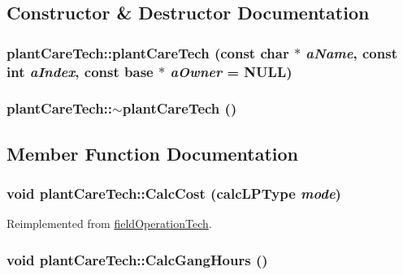 \subsection{Constructor \& Destructor Documentation}
\hypertarget{classplant_care_tech_a833337d3d8b192ab21e01e17e0907490}{
\subsubsection[{plantCareTech}]{\setlength{\rightskip}{0pt plus 5cm}plantCareTech::plantCareTech (const char $\ast$ {\em aName}, \/  const int {\em aIndex}, \/  const {\bf base} $\ast$ {\em aOwner} = {\ttfamily NULL})}}
\label{classplant_care_tech_a833337d3d8b192ab21e01e17e0907490}
\hypertarget{classplant_care_tech_add340452926f3160e902f5789f7ca0d4}{
\subsubsection[{$\sim$plantCareTech}]{\setlength{\rightskip}{0pt plus 5cm}plantCareTech::$\sim$plantCareTech ()}}
\label{classplant_care_tech_add340452926f3160e902f5789f7ca0d4}


\subsection{Member Function Documentation}
\hypertarget{classplant_care_tech_aafaa089fe218f4a9edb91842404160e5}{
\subsubsection[{CalcCost}]{\setlength{\rightskip}{0pt plus 5cm}void plantCareTech::CalcCost ({\bf calcLPType} {\em mode})}}
\label{classplant_care_tech_aafaa089fe218f4a9edb91842404160e5}


Reimplemented from \hyperlink{classfield_operation_tech_a908e81a53479de1a6768d58964dbc57c}{fieldOperationTech}.\hypertarget{classplant_care_tech_a3d5338d71d9ef7b80859ac1576084d7f}{
\subsubsection[{CalcGangHours}]{\setlength{\rightskip}{0pt plus 5cm}void plantCareTech::CalcGangHours ()}}
\label{classplant_care_tech_a3d5338d71d9ef7b80859ac1576084d7f}


